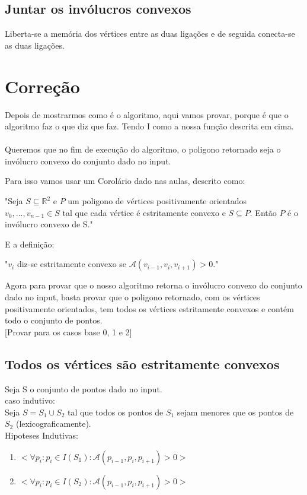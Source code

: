 \documentclass[11pt]{article}
\begin{document}
\subsection{ Juntar os invólucros convexos } 
Liberta-se a memória dos vértices entre as duas ligações e de seguida 
conecta-se as duas ligações.


\section{Correção}
Depois de mostrarmos como é o algoritmo,
aqui vamos provar, porque é que o algoritmo faz o que diz que faz.
Tendo I como a nossa função descrita em cima.\\
\\
Queremos que no fim de execução do algoritmo, o poligono
retornado seja o invólucro convexo do conjunto dado 
no input.\par
Para isso vamos usar um Corolário dado nas aulas, descrito como:

\begin{center}
    "Seja $S \subseteq \mathbb{R}^2$ e $P$ um poligono de vértices 
    positivamente orientados $v_0,...,v_{n-1} \in S$ tal que cada
    vértice é estritamente convexo e $S \subseteq P$. Então $P$ é
    o invólucro convexo de S."
\end{center}

E a definição:

\begin{center}
    "$v_i$ diz-se estritamente convexo se $\mathcal{A}(v_{i-1},v_i,v_{i+1}) > 0$."
\end{center}

Agora para provar que o nosso algoritmo retorna o invólucro convexo
do conjunto dado no input, basta provar que o poligono retornado,
com os vértices positivamente orientados, tem todos os vértices 
estritamente convexos e contém todo o conjunto de pontos.\\

[Provar para os casos base 0, 1 e 2]

\subsection{Todos os vértices são estritamente convexos}

Seja S o conjunto de pontos dado no input.\\

caso indutivo:\\
Seja $S = S_1 \cup S_2$ tal que todos os pontos de $S_1$
sejam menores que os pontos de $S_2$ (lexicograficamente).\\
Hipoteses Indutivas:
\begin{enumerate}
    \item $< \forall p_i : p_i \in I(S_1) : \mathcal{A}(p_{i-1}, p_i, p_{i+1}) > 0 >$
    \item $< \forall p_i : p_i \in I(S_2) : \mathcal{A}(p_{i-1}, p_i, p_{i+1}) > 0 >$
\end{enumerate}
\end{document}
